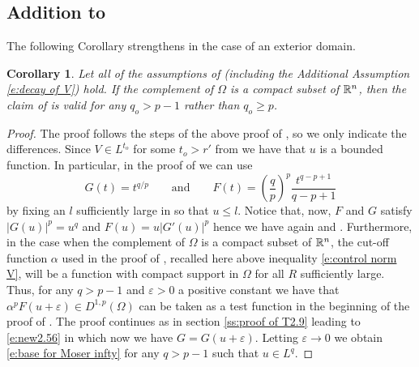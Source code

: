 \documentclass[10pt]{amsart}
\newtheorem{cor}[thrm]{Corollary}
\begin{document}
\subsection{Addition to \cite[Section 2]{V11}}
The following Corollary strengthens \cite[Theorem 2.9]{V11} in the case of an exterior domain.
 \begin{cor}\label{c:improved Lp}
  Let all of the assumptions of \cite[Theorem 2.9]{V11} (including the  Additional Assumption \eqref{e:decay of V}) hold. If  the complement of $\Omega$ is a compact subset of $\mathbb{R}^n$, then  the claim of \cite[Theorem 2.9]{V11} is valid for any $q_o >p-1$ rather than $q_o\geq p$.
 \end{cor}

 \begin{proof}
 The proof follows the steps of the above proof of \cite[Theorem 2.9]{V11}, so we only indicate the differences.  Since  $V\in L^{t_o}$ for some $t_o>r'$ from \cite[Theorem 2.1]{V11} we have that $u$ is a bounded function. In particular,  in the proof of \cite[Theorem 2.9]{V11} we can use
   $$G(t)=t^{q/p} \qquad\text{and}\qquad  F(t)=\left(\frac {q}{p} \right)^p\frac {t^{q-p+1}}{q-p+1}$$
   by fixing an $l$ sufficiently large in \cite[(2.15)]{V11} so that $u\leq l$.
   Notice that, now, $F$ and $G$ satisfy $|G(u)|^p=u^q$ and  $F(u)=u|G'(u)|^p$ hence we have again \cite[(2.16)]{V11} and \cite[(2.49)]{V11}. Furthermore, in the case when the complement of $\Omega$ is a compact subset of $\mathbb{R}^n$, the cut-off function $\alpha$  used in the proof of \cite[Theorem 2.9]{V11}, recalled  here above inequality \eqref{e:control norm V},   will be a function with compact support in $\Omega$ for all $R$ sufficiently large.
   Thus, for any $q>p-1$ and $\varepsilon>0$ a positive constant %
   we have that $\alpha^pF(u+\varepsilon)\in D^{1,p}(\Omega)$ can be taken as a test function in the beginning of the proof of \cite[Theorem 2.9]{V11}. The  proof continues as in section \ref{ss:proof of T2.9} leading  to \eqref{e:new2.56}  in which now we have $G=G(u+\varepsilon)$. Letting $\varepsilon\rightarrow 0$ we obtain \eqref{e:base for Moser infty} for any $q>p-1$ such that $u\in L^q$.
\end{proof}
\end{document}
